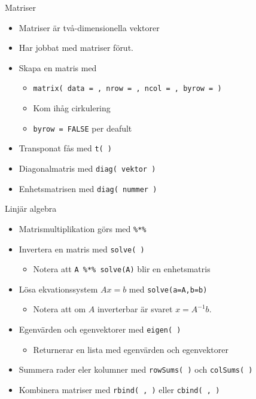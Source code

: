 \documentclass[
  11pt,
  ignorenonframetext,
  handout]{beamer}
\providecommand{\tightlist}{%
  \setlength{\itemsep}{0pt}\setlength{\parskip}{0pt}}
\begin{document}
\begin{frame}{Matriser}
\label{matriser}
\begin{itemize}
\tightlist
\item
  Matriser är två-dimensionella vektorer
\item
  Har jobbat med matriser förut.
\item
  Skapa en matris med

  \begin{itemize}
  \tightlist
  \item
    \texttt{matrix( data = , nrow = , ncol = , byrow = )}
  \item
    Kom ihåg cirkulering
  \item
    \texttt{byrow = FALSE} per deafult
  \end{itemize}
\item
  Transponat fås med \texttt{t( )}
\item
  Diagonalmatris med \texttt{diag( vektor )}
\item
  Enhetsmatrisen med \texttt{diag( nummer )}
\end{itemize}
\end{frame}

\begin{frame}{Linjär algebra}
\label{linjuxe4r-algebra-1}
\begin{itemize}
\tightlist
\item
  Matrismultiplikation görs med \texttt{\%*\%}
\item
  Invertera en matris med \texttt{solve( )}

  \begin{itemize}
  \tightlist
  \item
    Notera att \texttt{A \%*\% solve(A)} blir en enhetsmatris
  \end{itemize}
\item
  Lösa ekvationssystem \(Ax = b\) med \texttt{solve(a=A,b=b)}

  \begin{itemize}
  \tightlist
  \item
    Notera att om \(A\) inverterbar är svaret \(x = A^{-1}b\).
  \end{itemize}
\item
  Egenvärden och egenvektorer med \texttt{eigen( )}

  \begin{itemize}
  \tightlist
  \item
    Returnerar en lista med egenvärden och egenvektorer
  \end{itemize}
\item
  Summera rader eler kolumner med \texttt{rowSums( )} och
  \texttt{colSums( )}
\item
  Kombinera matriser med \texttt{rbind( , )} eller \texttt{cbind( , )}
\end{itemize}
\end{frame}
\end{document}

